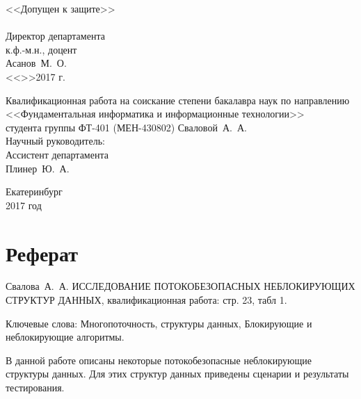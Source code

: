 \documentclass[12pt]{article}
\begin{document}
{		\hspace{-1cm}
		\begin{minipage}{80mm}
			\noindent
			\vspace{-2.3cm}
			\begin{flushleft}
				\begin{spacing}{1.0}
				\large <<Допущен к защите>>\\
				\hspace{6cm}\\
				\large Директор департамента\\
				\large к.ф.-м.н., доцент\\
				\large Асанов~М.~О.
				\underline{\hspace{6cm}}\\
				<<\underline{\hspace{0.7cm}}>>\underline{\hspace{3cm}}2017 г.
				\end{spacing}
			\end{flushleft}
		\end{minipage}
		\begin{minipage}{90mm}
			\begin{flushleft}
				\begin{spacing}{1.0}
				\large Квалификационная работа на соискание степени бакалавра наук по направлению\\
				\large <<Фундаментальная информатика и информационные технологии>>\\
				\large студента группы ФТ-401 (МЕН-430802) Сваловой~А.~А.\\
				\large Научный руководитель:\\
				\large Ассистент департамента\\
				\large Плинер~Ю.~А.
				\end{spacing}
			\end{flushleft}
		\end{minipage}
		
		\vfill
		
		\begin{center}
			Екатеринбург\\
			2017 год
		\end{center}
	}

 	\newpage
	
	{\pagestyle{plain}
		\tableofcontents
	}

	\newpage
	
	\section{Реферат}
		\par Свалова~А.~А. ИССЛЕДОВАНИЕ ПОТОКОБЕЗОПАСНЫХ НЕБЛОКИРУЮЩИХ СТРУКТУР ДАННЫХ, квалификационная работа: стр. 23, табл 1.
		\par Ключевые слова: Многопоточность, структуры данных, Блокирующие и неблокирующие алгоритмы.
		\par В данной работе описаны некоторые потокобезопасные неблокирующие структуры данных. Для этих структур данных приведены сценарии и результаты тестирования.
	
\end{document}

